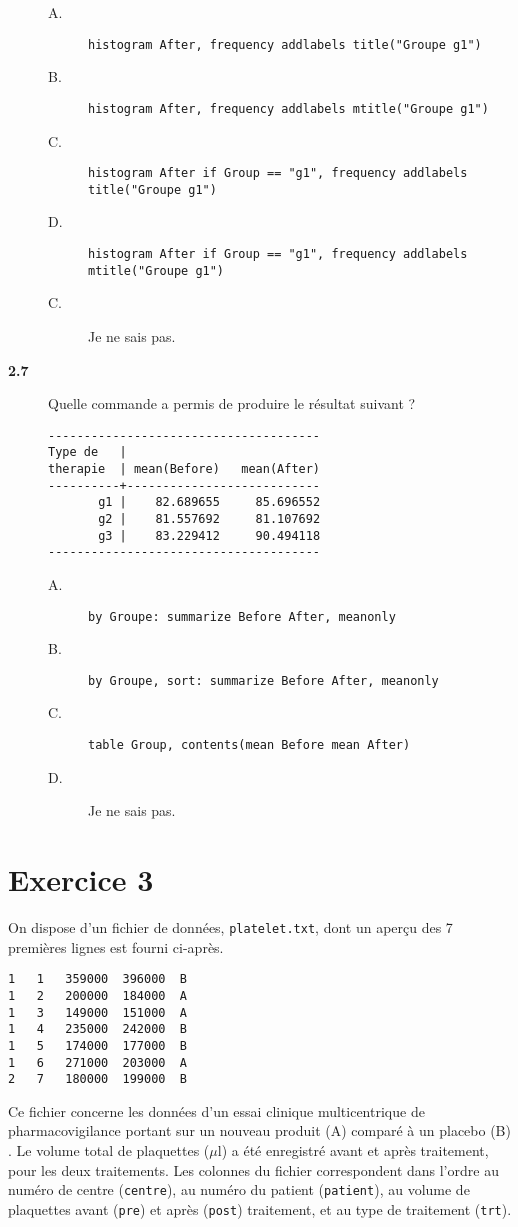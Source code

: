 \begin{description}
  \begin{description}
  \item[A.] \verb|histogram After, frequency addlabels title("Groupe g1")|
  \item[B.] \verb|histogram After, frequency addlabels mtitle("Groupe g1")|
  \item[C.] \verb|histogram After if Group == "g1", frequency addlabels title("Groupe g1")|
  \item[D.] \verb|histogram After if Group == "g1", frequency addlabels mtitle("Groupe g1")|
  \item[C.] Je ne sais pas.
  \end{description}
\item[\bf 2.7] Quelle commande a permis de produire le résultat suivant ? 
\begin{verbatim}
--------------------------------------
Type de   |
therapie  | mean(Before)   mean(After)
----------+---------------------------
       g1 |    82.689655     85.696552
       g2 |    81.557692     81.107692
       g3 |    83.229412     90.494118
--------------------------------------
\end{verbatim}
  \begin{description}
  \item[A.] \verb|by Groupe: summarize Before After, meanonly|
  \item[B.] \verb|by Groupe, sort: summarize Before After, meanonly|
  \item[C.] \verb|table Group, contents(mean Before mean After)|
  \item[D.] Je ne sais pas.
  \end{description}
\end{description}

\section*{Exercice 3}\label{dev7:exo3}
On dispose d'un fichier de données, \texttt{platelet.txt}, dont un aperçu
des 7 premières lignes est fourni ci-après.
\begin{verbatim}
1	1	359000	396000	B
1	2	200000	184000	A
1	3	149000	151000	A
1	4	235000	242000	B
1	5	174000	177000	B
1	6	271000	203000	A
2	7	180000	199000	B
\end{verbatim}
Ce fichier concerne les données d'un essai clinique multicentrique de
pharmacovigilance portant sur un nouveau produit (A) comparé à un placebo
(B) \citep{chow04}. Le volume total de plaquettes ($\mu$l) a été enregistré
avant et après traitement, pour les deux traitements. Les colonnes du
fichier correspondent dans l'ordre au numéro de centre (\texttt{centre}), au
numéro du patient (\texttt{patient}), au volume de plaquettes avant
(\texttt{pre}) et après (\texttt{post}) traitement, et au type de traitement
(\texttt{trt}).


